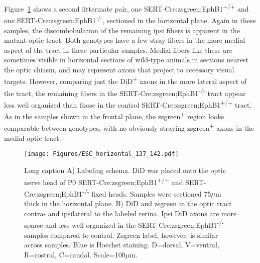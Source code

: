 Figure~\ref{ESChorizontal} shows a second littermate pair, one SERT-Cre:zsgreen;EphB1\textsuperscript{+/+} and one SERT-Cre:zsgreen;EphB1\textsuperscript{-/-}, sectioned in the horizontal plane.
Again in these samples, the discombobulation of the remaining ipsi fibers is apparent in the mutant optic tract.
Both genotypes have a few stray fibers in the more medial aspect of the tract in these particular samples.
Medial fibers like these are sometimes visible in horizontal sections of wild-type animals in sections nearest the optic chiasm, and may represent axons that project to accessory visual targets.
However, comparing just the DiD\textsuperscript{+} axons in the more lateral aspect of the tract, the remaining fibers in the SERT-Cre:zsgreen;EphB1\textsuperscript{-/-} tract appear less well organized than those in the control SERT-Cre:zsgreen;EphB1\textsuperscript{+/+} tract.
As in the samples shown in the frontal plane, the zsgreen\textsuperscript{+} region looks comparable between genotypes, with no obviously straying zsgreen\textsuperscript{+} axons in the medial optic tract.
\begin{figure}[hbtp]
    \begin{center}
        \texttt{[image: Figures/ESC\_horizontal\_137\_142.pdf]}
        \caption[Short caption]
        {Long caption
		A) Labeling schema.
		DiD was placed onto the optic nerve head of P0 SERT-Cre:zsgreen;EphB1\textsuperscript{+/+} and SERT-Cre:zsgreen;EphB1\textsuperscript{-/-} fixed heads.
		Samples were sectioned 75$\mu$m thick in the horizontal plane.
		B) DiD and zsgreen in the optic tract contra- and ipsilateral to the labeled retina.
		Ipsi DiD axons are more sparse and less well organized in the SERT-Cre:zsgreen;EphB1\textsuperscript{-/-} samples compared to control.
		Zsgreen label, however, is similar across samples.
		Blue is Hoechst staining.
		D=dorsal, V=ventral, R=rostral, C=caudal.
		Scale=100$\mu$m.}
        \label{ESChorizontal}
    \end{center}
\end{figure}

